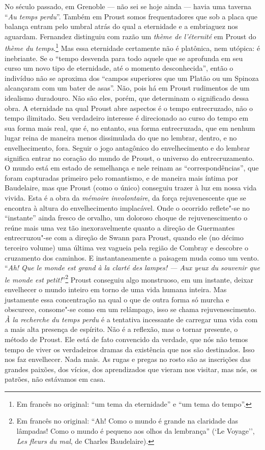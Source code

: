 No século passado, em Grenoble --- não sei se hoje ainda --- havia uma
taverna ``\emph{Au temps perdu}''. Também em Proust somos
frequentadores que sob a placa que balança entram pelo umbral atrás
do qual a eternidade e a embriaguez nos aguardam. Fernandez distinguiu
com razão um \emph{thème de l'éternité} em Proust do \emph{thème du
temps}.\footnote{Em francês no original: ``um tema da eternidade'' e ``um tema do tempo''. \versal{[N.~T.]}}
Mas essa eternidade certamente não é platônica, nem utópica: é
inebriante. Se o ``tempo desvenda para todo aquele que se aprofunda em
seu curso um novo tipo de eternidade, até o momento desconhecida'',
então o indivíduo não se aproxima dos ``campos superiores que um Platão
ou um Spinoza alcançaram com um bater de asas''. Não, pois há em Proust
rudimentos de um idealismo duradouro. Não são eles, porém, que
determinam o significado dessa obra. A eternidade na qual Proust abre
aspectos é o tempo entrecruzado, não o tempo ilimitado. Seu verdadeiro
interesse é direcionado ao curso do tempo em sua forma mais real, que é,
no entanto, sua forma entrecruzada, que em nenhum lugar reina de maneira
menos dissimulada do que no lembrar, dentro, e no envelhecimento, fora.
Seguir o jogo antagônico do envelhecimento e do lembrar significa entrar
no coração do mundo de Proust, o universo do entrecruzamento. O mundo
está em estado de semelhança e nele reinam as ``correspondências'', que
foram capturadas primeiro pelo romantismo, e de maneira mais íntima por
Baudelaire, mas que Proust (como o único) conseguiu trazer à luz em
nossa vida vivida. Esta é a obra da \emph{mémoire involontaire}, da
força rejuvenescente que se encontra à altura do envelhecimento
implacável. Onde o ocorrido reflete"-se no ``instante'' ainda fresco de
orvalho, um doloroso choque de rejuvenescimento o reúne mais uma vez tão
inexoravelmente quanto a direção de Guermantes entrecruzou"-se com a
direção de Swann para Proust, quando ele (no décimo terceiro volume) uma
última vez vagueia pela região de Combray e descobre o cruzamento dos
caminhos. E instantaneamente a paisagem muda como um vento. ``\emph{Ah! Que
le monde est grand à la clarté des lampes! --- Aux yeux du
souvenir que le monde est petit!}''\footnote{Em francês no original: ``Ah! Como o mundo é
  grande na claridade das lâmpadas! Como o mundo é pequeno aos olhos da
  lembrança'' (`Le Voyage'', \textit{Les fleurs du mal}, de Charles Baudelaire). \versal{[N.~T.]}} Proust conseguiu algo monstruoso, em um instante, deixar
envelhecer o mundo inteiro em torno de uma vida humana inteira. Mas
justamente essa concentração na qual o que de outra forma só murcha e
obscurece, consome"-se como em um relâmpago, isso se chama
rejuvenescimento. \emph{À la recherche du temps perdu} é a tentativa
incessante de carregar uma vida com a mais alta presença de espírito.
Não é a reflexão, mas o tornar presente, o método de Proust. Ele está
de fato convencido da verdade, que nós não temos tempo de viver os
verdadeiros dramas da existência que nos são destinados. Isso nos faz
envelhecer. Nada mais. As rugas e pregas no rosto são as inscrições das
grandes paixões, dos vícios, dos aprendizados que vieram nos visitar,
mas nós, os patrões, não estávamos em casa.

